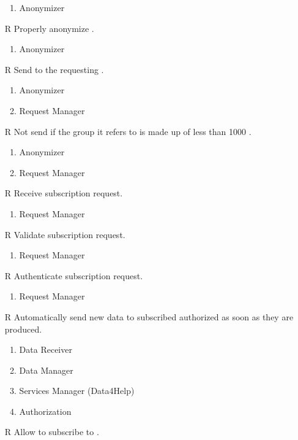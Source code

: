 \begin{itemize}
	\begin{enumerate}
		\item Anonymizer
	\end{enumerate}
	\item[R\subs{23}]Properly anonymize .
	\begin{enumerate}
		\item Anonymizer
	\end{enumerate}
	\item[R\subs{24}]Send  to the requesting .
	\begin{enumerate}
		\item Anonymizer
		\item Request Manager
	\end{enumerate}
	\item[R\subs{25}]Not send  if the group it refers to is made up of less than 1000 .
	\begin{enumerate}
		\item Anonymizer
		\item Request Manager
	\end{enumerate}
	\item[R\subs{26}]Receive  subscription request.
	\begin{enumerate}
		\item Request Manager
	\end{enumerate}
	\item[R\subs{27}]Validate  subscription request.
	\begin{enumerate}
		\item Request Manager
	\end{enumerate}
	\item[R\subs{28}]Authenticate  subscription request.
	\begin{enumerate}
		\item Request Manager
	\end{enumerate}
	\item[R\subs{29}]Automatically send new data to subscribed authorized  as soon as they are produced.
	\begin{enumerate}
		\item Data Receiver
		\item Data Manager
		\item Services Manager (Data4Help)
		\item Authorization
	\end{enumerate}
	\item[R\subs{30}]Allow  to subscribe to .

\end{itemize}
